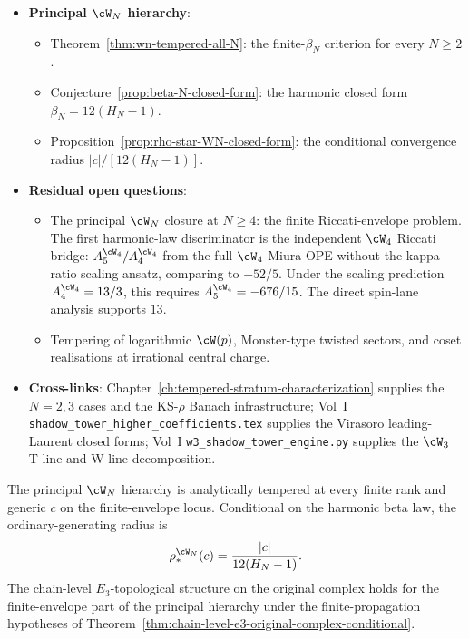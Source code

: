 \begin{itemize}[nosep]
\item \textbf{Principal $\cW_N$ hierarchy}:
 \begin{itemize}[nosep]
 \item Theorem~\ref{thm:wn-tempered-all-N}: the finite-$\beta_N$
 criterion for every $N \ge 2$.
 \item Conjecture~\ref{prop:beta-N-closed-form}: the harmonic
 closed form $\beta_N = 12(H_N - 1)$.
 \item Proposition~\ref{prop:rho-star-WN-closed-form}: the
 conditional convergence radius $|c|/[12(H_N-1)]$.
 \end{itemize}
\item \textbf{Residual open questions}:
 \begin{itemize}[nosep]
 \item The principal $\cW_N$ closure at $N\ge4$: the finite
 Riccati-envelope problem. The first harmonic-law discriminator
 is the independent $\cW_4$ Riccati bridge: $A_5^{\cW_4}/A_4^{\cW_4}$
 from the full $\cW_4$ Miura OPE without the kappa-ratio scaling
 ansatz, comparing to $-52/5$. Under the scaling prediction
 $A_4^{\cW_4}=13/3$, this requires $A_5^{\cW_4}=-676/15$. The
 direct spin-lane analysis supports $13$.
 \item Tempering of logarithmic $\cW(p)$, Monster-type twisted
 sectors, and coset realisations at irrational central charge.
 \end{itemize}
\item \textbf{Cross-links}: Chapter~\ref{ch:tempered-stratum-characterization}
 supplies the $N = 2, 3$ cases and the KS-$\rho$ Banach
 infrastructure; Vol~I \texttt{shadow\_tower\_higher\_coefficients.tex}
 supplies the Virasoro leading-Laurent closed forms; Vol~I
 \texttt{w3\_shadow\_tower\_engine.py} supplies the $\cW_3$ T-line
 and W-line decomposition.
\end{itemize}

The principal $\cW_N$ hierarchy is analytically tempered at every
finite rank and generic $c$ on the finite-envelope locus. Conditional
on the harmonic beta law, the ordinary-generating radius is
\[
 \rho_*^{\cW_N}(c)=\frac{|c|}{12(H_N-1)}.
\]
The chain-level $E_3$-topological structure on the original complex
holds for the finite-envelope part of the principal hierarchy under
the finite-propagation hypotheses of
Theorem~\ref{thm:chain-level-e3-original-complex-conditional}.

